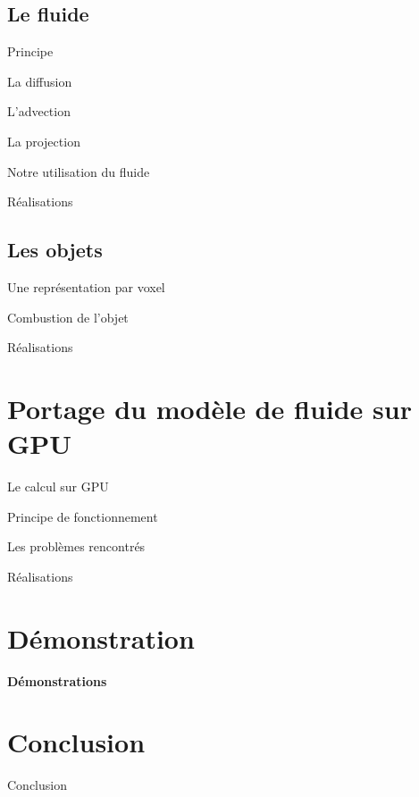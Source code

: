 \documentclass{beamer}
\begin{document}
\subsection{Le fluide}
\begin{frame}{Principe}
\end{frame}

\begin{frame}{La diffusion}
\end{frame}

\begin{frame}{L'advection}
\end{frame}

\begin{frame}{La projection}
\end{frame}

\begin{frame}{Notre utilisation du fluide}
\end{frame}

\begin{frame}{Réalisations}
\end{frame}

\subsection{Les objets}
\begin{frame}{Une représentation par voxel}
\end{frame}

\begin{frame}{Combustion de l'objet}
\end{frame}

\begin{frame}{Réalisations}
\end{frame}


\section{Portage du modèle de fluide sur GPU}
\begin{frame}{Le calcul sur GPU}
\end{frame}

\begin{frame}{Principe de fonctionnement}
\end{frame}

\begin{frame}{Les problèmes rencontrés}
\end{frame}

\begin{frame}{Réalisations}
\end{frame}

\section{Démonstration}
\begin{frame}
  \begin{center}
    \textbf{Démonstrations}
  \end{center}
\end{frame}

\section{Conclusion}
\begin{frame}{Conclusion}
\end{frame}
\end{document}
